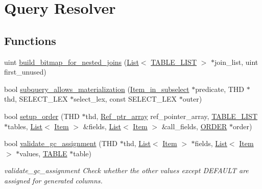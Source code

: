 \hypertarget{group__Query__Resolver}{}\section{Query Resolver}
\label{group__Query__Resolver}
\subsection*{Functions}
\begin{DoxyCompactItemize}
\item 
uint \mbox{\hyperlink{group__Query__Resolver_gab18726347ecf92d8985617dda1d60ba3}{build\+\_\+bitmap\+\_\+for\+\_\+nested\+\_\+joins}} (\mbox{\hyperlink{classList}{List}}$<$ \mbox{\hyperlink{structTABLE__LIST}{T\+A\+B\+L\+E\+\_\+\+L\+I\+ST}} $>$ $\ast$join\+\_\+list, uint first\+\_\+unused)
\item 
bool \mbox{\hyperlink{group__Query__Resolver_ga67ba0f5092d8f16edd545f8685a5f104}{subquery\+\_\+allows\+\_\+materialization}} (\mbox{\hyperlink{classItem__in__subselect}{Item\+\_\+in\+\_\+subselect}} $\ast$predicate, T\+HD $\ast$thd, S\+E\+L\+E\+C\+T\+\_\+\+L\+EX $\ast$select\+\_\+lex, const S\+E\+L\+E\+C\+T\+\_\+\+L\+EX $\ast$outer)
\item 
bool \mbox{\hyperlink{group__Query__Resolver_ga180a0a53f32a387f8af2c3b9db83d09e}{setup\+\_\+order}} (T\+HD $\ast$thd, \mbox{\hyperlink{classBounds__checked__array}{Ref\+\_\+ptr\+\_\+array}} ref\+\_\+pointer\+\_\+array, \mbox{\hyperlink{structTABLE__LIST}{T\+A\+B\+L\+E\+\_\+\+L\+I\+ST}} $\ast$tables, \mbox{\hyperlink{classList}{List}}$<$ \mbox{\hyperlink{classItem}{Item}} $>$ \&fields, \mbox{\hyperlink{classList}{List}}$<$ \mbox{\hyperlink{classItem}{Item}} $>$ \&all\+\_\+fields, \mbox{\hyperlink{structst__order}{O\+R\+D\+ER}} $\ast$order)
\item 
bool \mbox{\hyperlink{group__Query__Resolver_ga32c1578d1ffb07ec12c09b0cce88695a}{validate\+\_\+gc\+\_\+assignment}} (T\+HD $\ast$thd, \mbox{\hyperlink{classList}{List}}$<$ \mbox{\hyperlink{classItem}{Item}} $>$ $\ast$fields, \mbox{\hyperlink{classList}{List}}$<$ \mbox{\hyperlink{classItem}{Item}} $>$ $\ast$values, \mbox{\hyperlink{structTABLE}{T\+A\+B\+LE}} $\ast$table)
\begin{DoxyCompactList}\small\item\em validate\+\_\+gc\+\_\+assignment Check whether the other values except D\+E\+F\+A\+U\+LT are assigned for generated columns. \end{DoxyCompactList}\end{DoxyCompactItemize}


